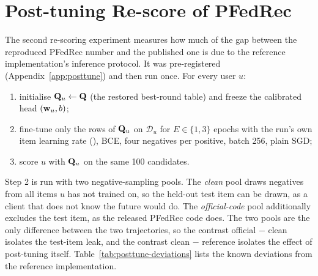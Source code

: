 \section{Post-tuning Re-score of PFedRec}
\label{sec:method-posttune}

The second re-scoring experiment measures how much of the gap between the reproduced PFedRec
number and the published one is due to the reference implementation's inference protocol. It
was pre-registered (Appendix~\ref{app:posttune}) and then run once. For every user $u$:
\begin{enumerate}[leftmargin=2em]
  \item initialise $\mathbf{Q}_u \leftarrow \mathbf{Q}$ (the restored best-round table) and freeze the
        calibrated head $(\mathbf{w}_u, b)$;
  \item fine-tune only the rows of $\mathbf{Q}_u$ on $\mathcal{D}_u$ for $E \in \{1, 3\}$ epochs with the
        run's own item learning rate (\PtLrItem), BCE, four negatives per positive, batch 256,
        plain SGD;
  \item score $u$ with $\mathbf{Q}_u$ on the same 100 candidates.
\end{enumerate}
Step 2 is run with two negative-sampling pools. The \emph{clean} pool draws negatives from all
items $u$ has not trained on, so the held-out test item can be drawn, as a client that does not
know the future would do. The \emph{official-code} pool additionally excludes the test item, as
the released PFedRec code does. The two pools are the only difference between the two
trajectories, so the contrast official $-$ clean isolates the test-item leak, and the contrast
clean $-$ reference isolates the effect of post-tuning itself. Table~\ref{tab:posttune-deviations}
lists the known deviations from the reference implementation.

